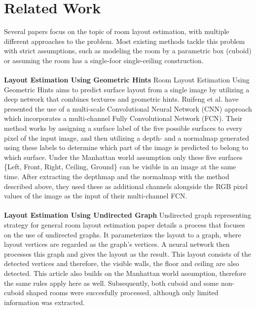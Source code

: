 \section{Related Work}
\label{sec:relatedwork}

Several papers focus on the topic of room layout estimation, with multiple
different approaches to the problem. Most existing methods tackle this problem
with strict assumptions, such as modeling the room by a parametric box (cuboid)
or assuming the room has a single-foor single-ceiling construction.

\paragraph{}

\textbf{Layout Estimation Using Geometric Hints} Room Layout Estimation Using
Geometric Hints\cite{8451365} aims to predict surface layout from a single image
by utilizing a deep network that combines textures and geometric hints. 
Ruifeng et al. \cite{8451365} have presented the use of a multi-scale 
Convolutional Neural Network (CNN) approach which incorporates a multi-channel
Fully Convolutional Network (FCN).
Their method works by assigning a surface label of the five possible surfaces to
every pixel of the input image, and then utilizing a depth- and a normalmap
generated using these labels to determine which part of the image is predicted to
belong to which surface. Under the Manhattan world assumption\cite{790349} only
these five surfaces \{Left, Front, Right, Ceiling, Ground\} can be visible in an
image at the same time. After extracting the depthmap and the normalmap with the
method described above, they used these as additional channels alongside the RGB
pixel values of the image as the input of their multi-channel FCN.

\paragraph{}

\textbf{Layout Estimation Using Undirected Graph}
Undirected graph representing strategy for general room layout estimation\cite{YAO2023103963}
paper details a process that focuses on the use of undirected graphs. It parameterizes the layout to a graph, where layout vertices are regarded as the graph's vertices. A neural network then processes this graph and gives the layout as the result. This layout consists of the detected vertices and therefore, the visible walls, the floor and ceiling are also detected. This article also builds on the Manhattan world assumption\cite{790349}, therefore the same rules apply here as well. Subsequently, both cuboid and some non-cuboid shaped rooms were succesfully processed, although only limited information was extracted.


